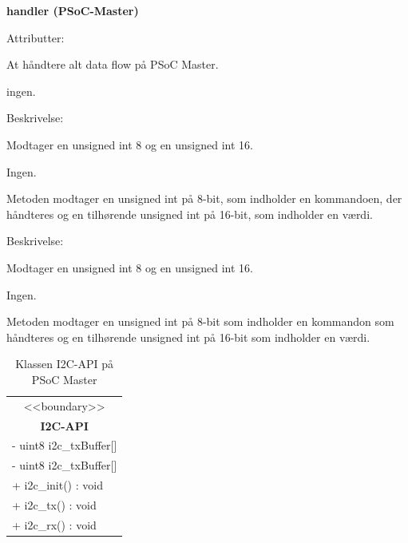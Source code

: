 {\centering\textbf{handler (PSoC-Master)}\par}

\begin{labeling}{Attributter:}
\item[Ansvar:] At håndtere alt data flow på PSoC Master.
\item[Attributter:] ingen.
\end{labeling}

\begin{labeling}{Beskrivelse:}
\item[void handleSPI(uint8, uint16)]
\item[Parametre:] Modtager en unsigned int 8 og en unsigned int 16.
\item [Returværdi:] Ingen.
\item [Beskrivelse:] Metoden modtager en unsigned int på 8-bit, som indholder en kommandoen, der håndteres og en tilhørende unsigned int på 16-bit, som indholder en værdi.
\end{labeling}

\begin{labeling}{Beskrivelse:}
\item[void handleI2C()]
\item[Parametre:]Modtager en unsigned int 8 og en unsigned int 16.
\item [Returværdi:] Ingen.
\item [Beskrivelse:] Metoden modtager en unsigned int på 8-bit som indholder en kommandon som håndteres og en tilhørende unsigned int på 16-bit som indholder en værdi.
\end{labeling}

\begin{table}[H]
    \centering
    \begin{tabular}{|l|}
    \hline
    \multicolumn{1}{|c|}{<<boundary>>} \\
    \multicolumn{1}{|c|}{\textbf{I2C-API}} \\
    \hline
    - uint8 i2c\_txBuffer[] \\
    - uint8 i2c\_txBuffer[] \\
    \hline
    + i2c\_init() : void \\
    + i2c\_tx() : void \\
    + i2c\_rx() : void \\
    \hline
    \end{tabular}
    \caption{Klassen I2C-API på PSoC Master}
    \label{tab:classI2cApiPSoCMaster}
\end{table}

